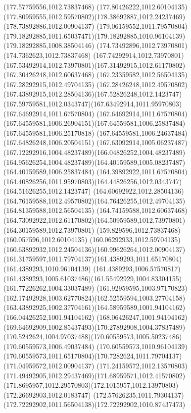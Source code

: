 {{\lineto(177.57759556,1012.73837468)
\lineto(177.80426222,1012.60104135)
\curveto(177.80959555,1012.59570802)(178.38692887,1012.24237469)(178.73892886,1012.00904137)
\curveto(179.06159552,1011.79570804)(179.18292885,1011.65037471)(179.18292885,1010.96104139)
\lineto(179.18292885,1008.38504146)
\lineto(174.73492896,1012.73970801)
\lineto(174.7362623,1012.73837468)
\lineto(167.74292914,1012.73970801)
\curveto(167.53492914,1012.73970801)(167.31492915,1012.61170802)(167.30426248,1012.60637468)
\lineto(167.23359582,1012.56504135)
\lineto(167.28292915,1012.49704135)
\curveto(167.28426248,1012.49570802)(167.43892915,1012.28504136)(167.52826248,1012.1423747)
\curveto(167.59759581,1012.0343747)(167.63492914,1011.95970803)(167.64692914,1011.67570804)
\curveto(167.64692914,1011.67570804)(167.64559581,1006.26904151)(167.64559581,1006.25837484)
\lineto(167.64559581,1006.25170818)
\lineto(167.64559581,1006.24637484)
\lineto(167.64826248,1006.20504151)
\curveto(167.63092914,1005.06237487)(167.12292916,1004.48237489)(166.04826252,1004.48237489)
\curveto(164.95626254,1004.48237489)(164.40159589,1005.08237487)(164.40159589,1006.25837484)
\lineto(164.39892922,1011.67570804)
\curveto(164.40826256,1011.95970803)(164.44826256,1012.0343747)(164.51626255,1012.1423747)
\curveto(164.60692922,1012.28504136)(164.76159588,1012.49570802)(164.76426255,1012.49704135)
\lineto(164.81359588,1012.56504135)
\lineto(164.74159588,1012.60637468)
\curveto(164.73092922,1012.61170802)(164.50959589,1012.73970801)(164.30159589,1012.73970801)
\lineto(159.829596,1012.73837468)
\lineto(160.057596,1012.60104135)
\curveto(160.06292933,1012.59704135)(160.63892932,1012.24504136)(160.99626264,1012.00904137)
\curveto(161.31759597,1011.79704137)(161.4389293,1011.65170804)(161.4389293,1010.96104139)
\lineto(161.4389293,1006.57570817)
\curveto(161.4389293,1005.61037486)(161.55492929,1004.83304155)(161.77226262,1004.33037489)
\curveto(161.92959595,1003.97170823)(162.17492928,1003.62770824)(162.52559594,1003.27704158)
\curveto(163.43892925,1002.37704161)(164.58959589,1001.94104162)(166.04426252,1001.94104162)
\curveto(168.06426247,1001.94104162)(169.64692909,1002.85437493)(170.27892908,1004.37837489)
\curveto(170.5242624,1004.97037488)(170.60559573,1005.50237486)(170.60559573,1006.49037484)
\lineto(170.60559573,1010.96104139)
\curveto(170.60559573,1011.65170804)(170.7282624,1011.79704137)(171.04959572,1012.00904137)
\curveto(171.24159572,1012.13570803)(171.49492905,1012.29437469)(171.68959571,1012.41570802)
\curveto(171.8695957,1012.29570803)(172.1015957,1012.13970803)(172.26692903,1012.0183747)
\curveto(172.57626235,1011.79304137)(172.72292902,1011.56504138)(172.72292902,1010.87437473)
}}
